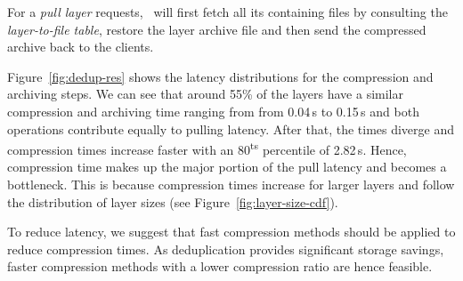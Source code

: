 For a \emph{pull layer} requests, \sysname\ will first fetch 
all its containing files by consulting the \emph{layer-to-file table}, 
restore the layer archive file and then send the compressed archive back
to the clients.

Figure~\ref{fig:dedup-res} shows the latency distributions for the compression
and archiving steps.
%
%
%
We can see that around 55\% of the layers have a similar compression and archiving
time ranging from from 0.04\,s to 0.15\,s and both operations contribute equally
to pulling latency.
%
%
After that, the times diverge and compression times increase faster with an
80\textsuperscript{ts} percentile of 2.82\,s.
%
Hence, compression time makes up the major portion of the pull latency and becomes a
bottleneck.
%
This is because compression times increase for larger layers and follow the distribution
of layer sizes (see Figure~\ref{fig:layer-size-cdf}).
%

%
To reduce latency, we suggest that fast compression methods should be applied to reduce
compression times. As deduplication provides significant storage savings, faster compression
methods with a lower compression ratio are hence feasible.

%

